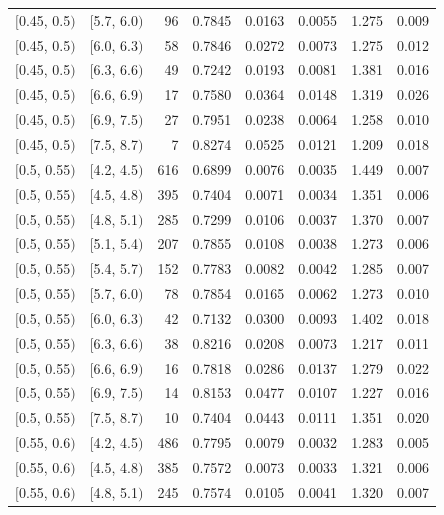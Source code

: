 \documentclass[11pt]{article}
\begin{document}
\begin{longtable}{| l | l | r | r | r | r | r | r |}
        $[$0.45, 0.5$)$ & $[$5.7, 6.0$)$ & 96 & 0.7845 & 0.0163 & 0.0055 & 1.275 & 0.009 \\
        $[$0.45, 0.5$)$ & $[$6.0, 6.3$)$ & 58 & 0.7846 & 0.0272 & 0.0073 & 1.275 & 0.012 \\
        $[$0.45, 0.5$)$ & $[$6.3, 6.6$)$ & 49 & 0.7242 & 0.0193 & 0.0081 & 1.381 & 0.016 \\
        $[$0.45, 0.5$)$ & $[$6.6, 6.9$)$ & 17 & 0.7580 & 0.0364 & 0.0148 & 1.319 & 0.026 \\
        $[$0.45, 0.5$)$ & $[$6.9, 7.5$)$ & 27 & 0.7951 & 0.0238 & 0.0064 & 1.258 & 0.010 \\
        $[$0.45, 0.5$)$ & $[$7.5, 8.7$)$ & 7 & 0.8274 & 0.0525 & 0.0121 & 1.209 & 0.018 \\
        $[$0.5, 0.55$)$ & $[$4.2, 4.5$)$ & 616 & 0.6899 & 0.0076 & 0.0035 & 1.449 & 0.007 \\
        $[$0.5, 0.55$)$ & $[$4.5, 4.8$)$ & 395 & 0.7404 & 0.0071 & 0.0034 & 1.351 & 0.006 \\
        $[$0.5, 0.55$)$ & $[$4.8, 5.1$)$ & 285 & 0.7299 & 0.0106 & 0.0037 & 1.370 & 0.007 \\
        $[$0.5, 0.55$)$ & $[$5.1, 5.4$)$ & 207 & 0.7855 & 0.0108 & 0.0038 & 1.273 & 0.006 \\
        $[$0.5, 0.55$)$ & $[$5.4, 5.7$)$ & 152 & 0.7783 & 0.0082 & 0.0042 & 1.285 & 0.007 \\
        $[$0.5, 0.55$)$ & $[$5.7, 6.0$)$ & 78 & 0.7854 & 0.0165 & 0.0062 & 1.273 & 0.010 \\
        $[$0.5, 0.55$)$ & $[$6.0, 6.3$)$ & 42 & 0.7132 & 0.0300 & 0.0093 & 1.402 & 0.018 \\
        $[$0.5, 0.55$)$ & $[$6.3, 6.6$)$ & 38 & 0.8216 & 0.0208 & 0.0073 & 1.217 & 0.011 \\
        $[$0.5, 0.55$)$ & $[$6.6, 6.9$)$ & 16 & 0.7818 & 0.0286 & 0.0137 & 1.279 & 0.022 \\
        $[$0.5, 0.55$)$ & $[$6.9, 7.5$)$ & 14 & 0.8153 & 0.0477 & 0.0107 & 1.227 & 0.016 \\
        $[$0.5, 0.55$)$ & $[$7.5, 8.7$)$ & 10 & 0.7404 & 0.0443 & 0.0111 & 1.351 & 0.020 \\
        $[$0.55, 0.6$)$ & $[$4.2, 4.5$)$ & 486 & 0.7795 & 0.0079 & 0.0032 & 1.283 & 0.005 \\
        $[$0.55, 0.6$)$ & $[$4.5, 4.8$)$ & 385 & 0.7572 & 0.0073 & 0.0033 & 1.321 & 0.006 \\
        $[$0.55, 0.6$)$ & $[$4.8, 5.1$)$ & 245 & 0.7574 & 0.0105 & 0.0041 & 1.320 & 0.007 \\

\end{longtable}
\end{document}
